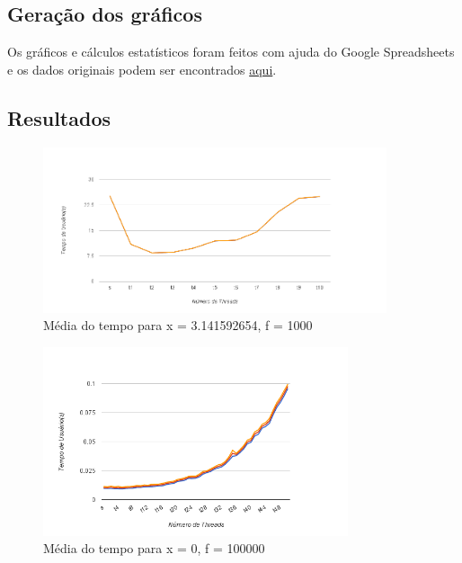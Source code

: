 \documentclass[paper=a4, fontsize=11pt]{scrartcl}
\numberwithin{equation}{section}		%
\numberwithin{figure}{section}			%
\numberwithin{table}{section}				%
\begin{document}
\subsection{Geração dos gráficos}
Os gráficos e cálculos estatísticos foram feitos com ajuda do Google Spreadsheets e os dados originais podem ser encontrados \href{https://docs.google.com/spreadsheets/d/10F9Elp18penPIfwJ-gPzf1omaWTKKJAMlrtgMT_AK0c/edit?usp=sharing}{aqui}.\\

\subsection{Resultados}

\begin{figure}[H]
	\centering
	\includegraphics[width=0.9\textwidth]{image}
	\caption{Média do tempo para x = 3.141592654, f = 1000}
	\label{image1}
\end{figure}

\begin{figure}[H]
	\centering
	\includegraphics[width=0.8\textwidth]{image2}
	\caption{Média do tempo para x = 0, f = 100000}
	\label{image2}
\end{figure}
\end{document}
